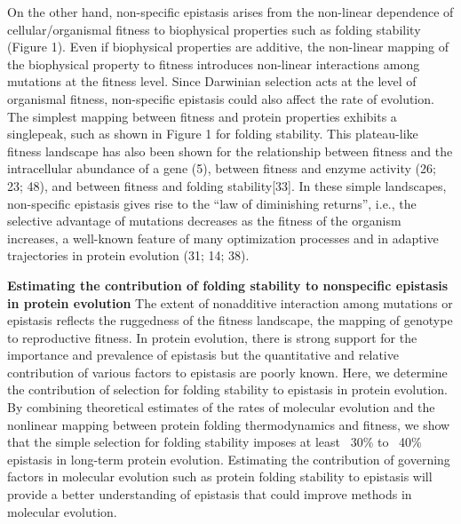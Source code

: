 On the other hand, non-specific epistasis arises from the non-linear dependence of
cellular/organismal fitness to biophysical properties such as folding stability (Figure 1). Even if biophysical properties are additive, the non-linear mapping of the biophysical property to fitness introduces non-linear interactions among mutations at the fitness level. Since Darwinian selection acts at the level of organismal fitness, non-specific epistasis could also affect the rate of evolution. The simplest mapping between fitness and protein properties exhibits a singlepeak, such as shown in Figure 1 for folding stability. This plateau-like fitness landscape has also been shown for the relationship between fitness and the intracellular abundance of a gene (5), between fitness and enzyme activity (26; 23; 48), and between fitness and folding stability[33]. In these simple landscapes, non-specific epistasis gives rise to the “law of diminishing returns”, i.e., the selective advantage of mutations decreases as the fitness of the organism increases, a well-known feature of many optimization processes and in adaptive trajectories in protein evolution (31; 14; 38).

\textbf{Estimating the contribution of folding stability to nonspecific epistasis in protein evolution }
The extent of nonadditive interaction among mutations or epistasis reflects the ruggedness of the fitness landscape, the mapping of genotype to reproductive fitness. In protein evolution, there is strong support for the importance and prevalence of epistasis but the quantitative and relative contribution of various factors to epistasis are poorly known. Here, we determine the contribution of selection for folding stability to epistasis in protein evolution. By combining theoretical estimates of the rates of molecular evolution and the nonlinear mapping between protein folding thermodynamics and fitness, we show that the simple selection for folding stability imposes at least ~30\% to ~40\% epistasis in long-term protein evolution. Estimating the contribution of governing factors in molecular evolution such as protein folding stability to epistasis will provide a better understanding of epistasis that could improve methods in molecular evolution.
 \citep{Dasmeh2018}


